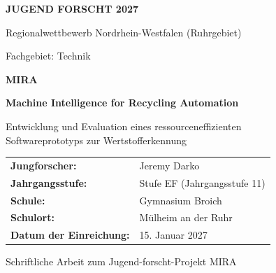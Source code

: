 \begin{titlepage}
    \centering
    \vspace*{1.5cm}
    {\large\textbf{JUGEND FORSCHT 2027}\par}
    \vspace{0.35cm}
    {\large Regionalwettbewerb Nordrhein-Westfalen (Ruhrgebiet)\par}
    {\large Fachgebiet: Technik\par}

    \vspace{2.2cm}
    {\huge\bfseries MIRA\par}
    \vspace{0.45cm}
    {\Large\bfseries Machine Intelligence for Recycling Automation\\}
    {\large Entwicklung und Evaluation eines ressourceneffizienten\\Softwareprototyps zur Wertstofferkennung\par}

    \vspace{2.3cm}
    \begin{tabular}{ll}
        \textbf{Jungforscher:} & Jeremy Darko \\
        \textbf{Jahrgangsstufe:} & Stufe EF (Jahrgangsstufe 11) \\
        \textbf{Schule:} & Gymnasium Broich \\
        \textbf{Schulort:} & Mülheim an der Ruhr \\
        \textbf{Datum der Einreichung:} & 15. Januar 2027 \\
    \end{tabular}

    \vfill
    {\small Schriftliche Arbeit zum Jugend-forscht-Projekt MIRA\par}
\end{titlepage}
